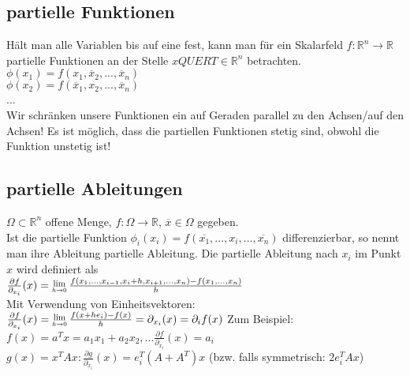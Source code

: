 \documentclass[german]{latex4ei/latex4ei_sheet}
\begin{document}
\begin{sectionbox}	


	\subsection{partielle Funktionen}
	H\"alt man alle Variablen bis auf eine fest, kann man f\"ur ein Skalarfeld $f: \mathbb{R}^n \rightarrow \mathbb{R}$ partielle Funktionen an der Stelle $xQUERT \in \mathbb{R}^n$ betrachten.\\
	$\phi(x_1) = f(x_1, \overline{x}_2, ..., \overline{x}_n)$\\
	$\phi(x_2) = f(\overline{x}_1, x_2, ..., \overline{x}_n)$\\
	...\\
	Wir schr\"anken unsere Funktionen ein auf Geraden parallel zu den Achsen/auf den Achsen! Es ist m\"oglich, dass die partiellen Funktionen stetig sind, obwohl die Funktion unstetig ist!
	
	\subsection{partielle Ableitungen}
	$\Omega \subset \mathbb{R}^n$ offene Menge, $f:\Omega \rightarrow \mathbb{R}$, $\overline{x} \in \Omega$ gegeben.\\
	Ist die partielle Funktion $\phi_i(x_i)=f(\overline{x_1},...,x_i,...,\overline{x_n})$ differenzierbar, so nennt man ihre Ableitung partielle Ableitung. Die partielle Ableitung nach $x_i$ im Punkt $x$ wird definiert als\\
	$\frac{\partial f}{\partial_{x_i}}(x) = \Lim{h \to 0} \frac{f(x_1,...,x_{i-1},x_i+h,x_{i+1},...,x_n) - f(x_1,...,x_n)}{h}$\\
	Mit Verwendung von Einheitsvektoren:\\
	$\frac{\partial f}{\partial_{x_i}}(x) = \Lim{h \to 0} \frac{f(x+h e_i) - f(x)}{h} = \partial_{x_i}(x)=\partial_i f(x)$
	Zum Beispiel:\\
	$f(x)=a^T x=a_1 x_1+a_2 x_2,... \frac{\partial f}{\partial_{x_i}}(x)=a_i$
	$g(x)=x^T A x: \frac{\partial g}{\partial_{x_i}}(x)=e_i^T(A+A^T)x$ (bzw. falls symmetrisch: $2 e_i^T A x$)
\end{sectionbox}
\end{document}
